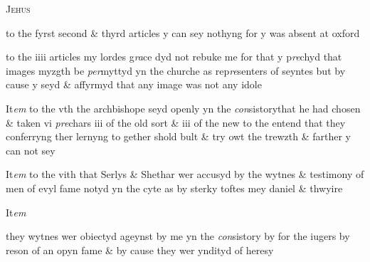 \documentclass[12pt, a4paper]{book}
\begin{document}
				\begin{center} \begin{large} {\scshape Jehus} \end{large} \end{center}
			
            		
		\ifthenelse{\isodd{\thepage}}
		{\reversemarginpar}
		{\normalmarginpar}
		to the fyrst second \& thyrd articles y can sey nothyng for  y was absent at oxford
            		
            			
				\marginpar[\vspace{0.5cm}{\textcolor{Gray}{4}}]{}
			
            			
		\ifthenelse{\isodd{\thepage}}
		{\reversemarginpar}
		{\normalmarginpar}
		to the iiii articles my lordes g\textit{ra}ce dyd not rebuke me for that y p\textit{re}chyd that images myzgth be \textit{per}myttyd yn the churche as rep\textit{re}senters of seyntes but by cause y seyd \& affyrmyd that any image was not any idole
            		
            		
            			
				\marginpar[\vspace{0.5cm}{\textcolor{Gray}{4}}]{}
			
            			
		\ifthenelse{\isodd{\thepage}}
		{\reversemarginpar}
		{\normalmarginpar}
		It\textit{em} to the vth the archbishope seyd openly yn the \textit{con}sistorythat he had chosen  \& taken vi \textit{pre}chars iii of the old sort \& iii of the new to the entend that they conferryng ther lernyng to gether shold bult \& try owt the trewzth \& farther y can not sey
            		
				\marginpar[\vspace{0.5cm}{\textcolor{Gray}{6}}]{}
			
            			
		\ifthenelse{\isodd{\thepage}}
		{\reversemarginpar}
		{\normalmarginpar}
		It\textit{em} to the vith that Serlys \& Shethar wer accusyd by the wytnes \& testimony of men of evyl fame notyd yn the cyte  as by sterky toftes mey daniel \& thwyire
            		
            		
            			
				\marginpar[\vspace{0.5cm}{\textcolor{Gray}{8}}]{}
			 It\textit{em}
            			
		\ifthenelse{\isodd{\thepage}}
		{\reversemarginpar}
		{\normalmarginpar}
		they wytnes wer obiectyd ageynst by me yn the \textit{con}sistory by for the iugers by reson of an opyn fame \& by cause they wer yndityd of heresy
            		
\end{document}
